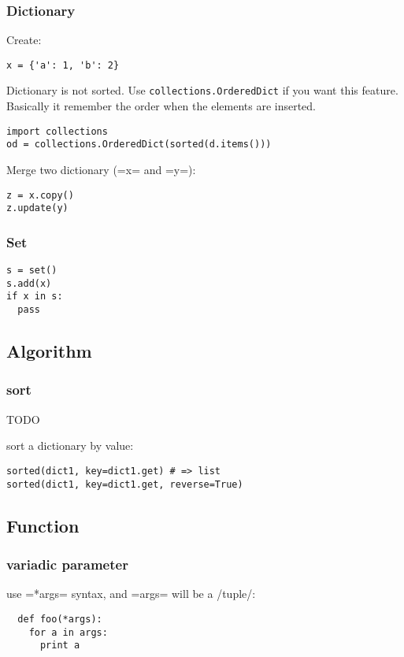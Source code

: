 \subsubsection{Dictionary}
Create:
\begin{lstlisting}
x = {'a': 1, 'b': 2}
\end{lstlisting}

Dictionary is not sorted. Use \texttt{collections.OrderedDict} if you
want this feature.  Basically it remember the order when the elements
are inserted.

\begin{lstlisting}
import collections
od = collections.OrderedDict(sorted(d.items()))
\end{lstlisting}

Merge two dictionary (=x= and =y=):
\begin{lstlisting}
z = x.copy()
z.update(y)
\end{lstlisting}


\subsubsection{Set}
\begin{lstlisting}
s = set()
s.add(x)
if x in s:
  pass
\end{lstlisting}




\subsection{Algorithm}
\subsubsection{sort}
TODO

sort a dictionary by value:
\begin{lstlisting}
sorted(dict1, key=dict1.get) # => list
sorted(dict1, key=dict1.get, reverse=True)
\end{lstlisting}


\subsection{Function}
\subsubsection{variadic parameter}
use =*args= syntax, and =args= will be a /tuple/:
\begin{lstlisting}
  def foo(*args):
    for a in args:
      print a
\end{lstlisting}

